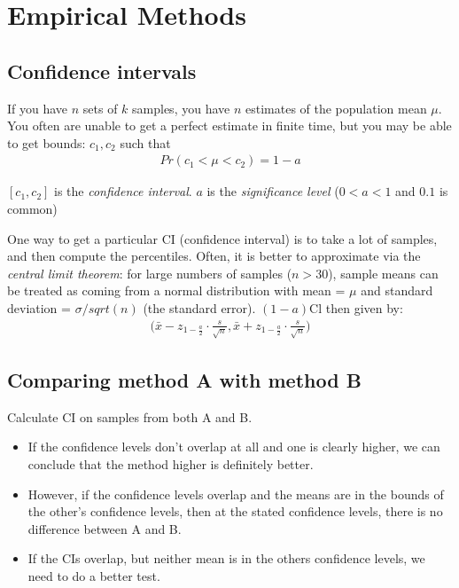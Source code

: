 \documentclass[11pt,a4paper,titlepage,dvipsnames,cmyk]{scrartcl}
\begin{document}
\section{Empirical Methods}
\subsection{Confidence intervals}
If you have $n$ sets of $k$ samples, you have $n$ estimates of the population mean $\mu$. You often are unable to get a perfect estimate in finite time, but you may be able to get bounds: $c_1, c_2$ such that
\begin{align*}
Pr(c_1 < \mu < c_2) = 1 - a
\end{align*}

$[c_1,c_2]$ is the \textit{confidence interval}. $a$ is the \textit{significance level} ($0 < a < 1$ and $0.1$ is common)

One way to get a particular CI (confidence interval) is to take a lot of samples, and then compute the percentiles. Often, it is better to approximate via the \textit{central limit theorem}: for large numbers of samples ($n > 30$), sample means can be treated as coming from a normal distribution with mean = $\mu$ and standard deviation = $\sigma / sqrt(n)$ (the standard error). $(1-a)$Cl then given by:
\begin{align*}
\bigg (\bar x - z_{1-\frac{a}{2}} \cdot \frac{s}{\sqrt n}, \bar x + z_{1-\frac{a}{2}} \cdot \frac{s}{\sqrt{n}} \bigg )
\end{align*}

\subsection{Comparing method A with method B}
Calculate CI on samples from both A and B.
\begin{itemize}
    \item If the confidence levels don't overlap at all and one is clearly higher, we can conclude that the method higher is definitely better.
    \item However, if the confidence levels overlap and the means are in the bounds of the other's confidence levels, then at the stated confidence levels, there is no difference between A and B.
    \item If the CIs overlap, but neither mean is in the others confidence levels, we need to do a better test.
\end{itemize}
\end{document}
